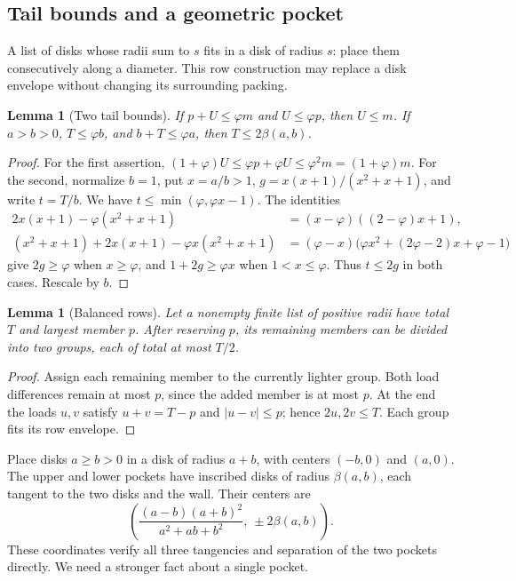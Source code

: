 \documentclass[11pt]{article}
\newtheorem{lemma}[theorem]{Lemma}
\theoremstyle{definition}
\begin{document}
\subsection{Tail bounds and a geometric pocket}

A list of disks whose radii sum to $s$ fits in a disk of radius $s$:
place them consecutively along a diameter. This row construction may
replace a disk envelope without changing its surrounding packing.

\begin{lemma}[Two tail bounds]\label{gt:tails}
If $p+U\le\varphi m$ and $U\le\varphi p$, then $U\le m$.
If $a>b>0$, $T\le\varphi b$, and $b+T\le\varphi a$, then
$T\le2\beta(a,b)$.
\end{lemma}
\begin{proof}
For the first assertion,
$(1+\varphi)U\le\varphi p+\varphi U\le\varphi^2m=(1+\varphi)m$.
For the second, normalize $b=1$, put $x=a/b>1$,
$g=x(x+1)/(x^2+x+1)$, and write $t=T/b$. We have
$t\le\min(\varphi,\varphi x-1)$. The identities
\begin{align*}
 2x(x+1)-\varphi(x^2+x+1)
   &=(x-\varphi)((2-\varphi)x+1),\\
 (x^2+x+1)+2x(x+1)-\varphi x(x^2+x+1)
   &=(\varphi-x)\bigl(\varphi x^2+(2\varphi-2)x+\varphi-1\bigr)
\end{align*}
give $2g\ge\varphi$ when $x\ge\varphi$, and
$1+2g\ge\varphi x$ when $1<x\le\varphi$. Thus $t\le2g$ in
both cases. Rescale by $b$.
\end{proof}

\begin{lemma}[Balanced rows]\label{gt:split}
Let a nonempty finite list of positive radii have total $T$ and largest
member $p$. After reserving $p$, its remaining members can be divided
into two groups, each of total at most $T/2$.
\end{lemma}
\begin{proof}
Assign each remaining member to the currently lighter group. Both load
differences remain at most $p$, since the added member is at most $p$.
At the end the loads $u,v$ satisfy $u+v=T-p$ and $|u-v|\le p$;
hence $2u,2v\le T$. Each group fits its row envelope.
\end{proof}

Place disks $a\ge b>0$ in a disk of radius $a+b$, with centers
$(-b,0)$ and $(a,0)$. The upper and lower pockets have inscribed
disks of radius $\beta(a,b)$, each tangent to the two disks and the wall.
Their centers are
\[
 \left(\frac{(a-b)(a+b)^2}{a^2+ab+b^2},\ \pm2\beta(a,b)\right).
\]
These coordinates verify all three tangencies and separation of the two
pockets directly. We need a stronger fact about a single pocket.
\end{document}
